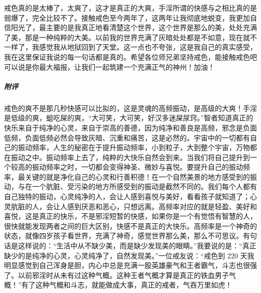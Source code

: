 \begin{case}
    戒色真的是太棒了，太爽了，这才是真正的大爽，手淫所谓的快感与之相比真的是弱爆了，完全比较不了。接触戒色至今两年了，这两年让我彻底地蜕变，我更加自信阳光了，最主要的是我真正地看清楚这个世界，这个世界是那么的美，处处充满了美，那是一种纯粹的大美。以前我的世界充满了灰暗处处都是不如意，现在就不一样了，我感觉我从地狱回到了天堂。这一点也不夸张，这是我自己的真实感受，我在这里保证我说的每一句话都是真的。希望各位师兄弟坚持戒色，能接触戒色吧可以说是你最大福报，让我们一起筑建一个充满正气的神州！加油！
    \subparagraph{附评} 戒色的爽不是那几秒快感可以比拟的，这是灵魂的高频振动，是高级的大爽！手淫是低级的爽，蛆吃屎的爽，“大可笑，大可笑，好汉多迷屎尿窍。”智者知道真正的快乐来自于纯净的心灵，来自于崇高的善德，因为纯净和善良是高频，邪念是负面低频，负面低频必然会导致灰暗、沉重和痛苦，这是必然的。宇宙中的一切都有自己的振动频率，人生的秘密在于提升振动频率，小到粒子，大到整个宇宙，万物都在振动之中。振动频率上去了，纯粹的大快乐自然会到来。当我们将自己提升到一个较高的振动频率之时，一切都会变得神圣、微妙与喜悦。要提升自己的振动频率，最关键的就是净化自己的心灵和行善积德！在一个自然美景的地方感受到的振动，与在一个肮脏、受污染的地方所感受到的振动是截然不同的。我们每个人都有自己独特的振动，心灵纯净的人，会让人感到喜悦与美好，看看孩子就知道了；心灵肮脏的人，会让人感到厌恶和恶心，只想远离。高频率对应的就是轻盈、美好和喜悦，这是真正的快乐，不是邪淫短暂的快感，如果你是一个有觉悟有智慧的人，很快就能发现两者之间的巨大区别，快感不是真正的大快乐。高频率是一个神奇的状态，就像四岁孩子看世界，充满了神奇，感觉世界那么美，那么不可思议。有句话是这样说的：“生活中从不缺少美，而是缺少发现美的眼睛。”我要说的是：“真正缺少的是纯净的心灵，心灵纯净了，自然发现美。”一位戒友说：“戒色到 220 天我明显感觉到自己浑身是胆，内心中总是充满一股英雄豪气和王者霸气，斗志也很强了。以前邪淫时从未有过这种气概。这种王者气概才算是真正的铁血男子气概！”有了这种气概和斗志，就能做成大事，真正的戒者，气吞万里如虎！


\end{case}
